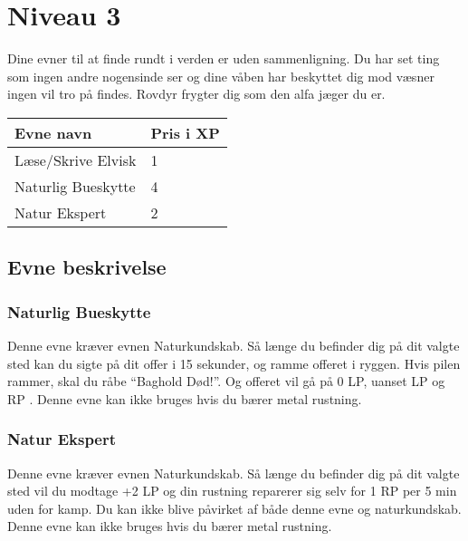 \chapter{Niveau 3}

Dine evner til at finde rundt i verden er uden sammenligning. Du har set ting som ingen andre nogensinde ser og dine våben har beskyttet dig mod væsner ingen vil tro på findes. Rovdyr frygter dig som den alfa jæger du er.

\begin{table}[H]
    \centering
    \begin{tabular}{|p{}|p{}|}
    \rowcolor{cerulean!80}\hline
        Evne navn & Pris i XP \\\hline
        Læse/Skrive Elvisk & 1\\\hline
        Naturlig Bueskytte & 4\\\hline
        Natur Ekspert & 2\\\hline
    \end{tabular}
\end{table}
\section{Evne beskrivelse}



\subsection{Naturlig Bueskytte}
Denne evne kræver evnen Naturkundskab. Så længe du befinder dig på dit valgte sted kan du sigte på dit offer i 15 sekunder, og ramme offeret i ryggen. Hvis pilen rammer, skal du råbe “Baghold Død!”. Og offeret vil gå på 0 LP, uanset LP og RP . Denne evne kan ikke bruges hvis du bærer metal rustning.

\subsection{Natur Ekspert}
Denne evne kræver evnen Naturkundskab. Så længe du befinder dig på dit valgte sted vil du modtage +2 LP og din rustning reparerer sig selv for 1 RP per 5 min uden for kamp. Du kan ikke blive påvirket af både denne evne og naturkundskab. Denne evne kan ikke bruges hvis du bærer metal rustning.